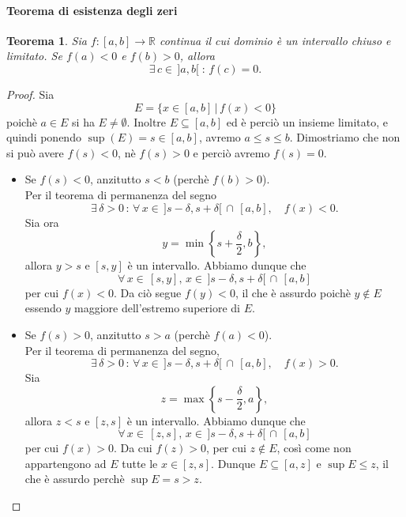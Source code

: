 \documentclass{article}
\theoremstyle{plain}
\newtheorem{thm}{Teorema}[section]
\theoremstyle{definition}
\theoremstyle{remark}
\begin{document}
\paragraph{Teorema di esistenza degli zeri}
\begin{bxthm}
\begin{thm}
    Sia $f:[a,b]\to\mathbb{R}$ continua il cui dominio è un intervallo chiuso e limitato.
    Se $f(a)<0$ e $f(b)>0$, allora \[\exists\, c\in \,]a,b[\;:\,f(c)=0.\]
\end{thm}
\end{bxthm}
\begin{proof}
    Sia \[E=\{x\in[a,b]\, |\, f(x)<0\}\] poichè $a\in E$ si ha $E\neq\emptyset$.
    Inoltre $E\subseteq[a,b]$ ed è perciò un insieme limitato, e quindi ponendo $\sup(E)=s\in[a,b]$, avremo $a\leq s\leq b$.
    Dimostriamo che non si può avere $f(s)<0$, nè $f(s)>0$ e perciò avremo $f(s)=0$.
    \begin{itemize}
        \item Se $f(s)<0$, anzitutto $s<b$ (perchè $f(b)>0$).\\
        Per il teorema di permanenza del segno \[\exists\, \delta>0 \,:\, \forall\, x\in\, ]s-\delta,s+\delta[\,\cap\,[a,b],\quad f(x)<0.\] 
        Sia ora \[y=\min\left\{s+\dfrac{\delta}{2},b\right\},\] allora $y>s$ e $[s,y]$ è un intervallo. 
        Abbiamo dunque che 
        \[\forall\, x\in\,[s,y],\,x\in\, ]s-\delta,s+\delta[\,\cap\,[a,b]\]
        per cui $f(x)<0$.
        Da ciò segue $f(y)<0$, il che è assurdo poichè $y\notin E$ essendo $y$ maggiore dell'estremo superiore di $E$.

        \item Se $f(s)>0$, anzitutto $s>a$ (perchè $f(a)<0$).\\
        Per il teorema di permanenza del segno, 
        \[\exists\,\delta>0\,:\,\forall\, x\in\, ]s-\delta,s+\delta[\,\cap\,[a,b],\quad f(x)>0.\]
        Sia \[z=\max\left\{s-\dfrac{\delta}{2},a\right\},\] allora $z<s$ e $[z,s]$ è un intervallo. 
        Abbiamo dunque che 
        \[\forall\, x\in\,[z,s],\,x\in\, ]s-\delta,s+\delta[\,\cap\,[a,b]\]
        per cui $f(x)>0$. Da cui $f(z)>0$, per cui $z\notin E$, così come non appartengono ad $E$ tutte le $x\in[z,s]$.
        Dunque $E\subseteq[a,z]$ e $\sup E\leq z$, il che è assurdo perchè $\sup E=s>z.$
    \end{itemize}
\end{proof}

\vspace{10pt}
\end{document}

